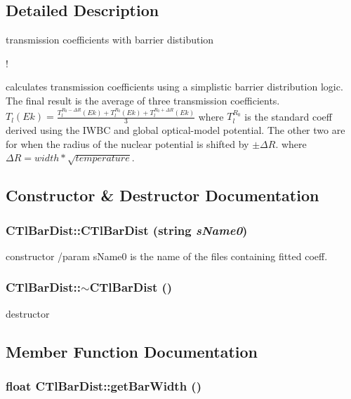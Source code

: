 \subsection{Detailed Description}
transmission coefficients with barrier distibution 

!

calculates transmission coefficients using a simplistic barrier distribution logic. The final result is the average of three transmission coefficients. $ T_{l}(Ek) = \frac{T_{l}^{R_{0}-\Delta R}(Ek) + T_{l}^{R_{0}}(Ek) + T_{l}^{R_{0}+\Delta R}(Ek)}{3} $ where $ T_{l}^{R_{0}}$ is the standard coeff derived using the IWBC and global optical-model potential. The other two are for when the radius of the nuclear potential is shifted by $ \pm \Delta R $. where $ \Delta R = width*\sqrt{temperature} $. 



\subsection{Constructor \& Destructor Documentation}
\subsubsection{\setlength{\rightskip}{0pt plus 5cm}CTl\-Bar\-Dist::CTl\-Bar\-Dist (string {\em s\-Name0})}\label{classCTlBarDist_f7073363a1867be812439512e618440b}


constructor /param s\-Name0 is the name of the files containing fitted coeff. 
\subsubsection{\setlength{\rightskip}{0pt plus 5cm}CTl\-Bar\-Dist::$\sim$CTl\-Bar\-Dist ()}\label{classCTlBarDist_33ee7618d6bf5794654b927ec4c8df20}


destructor 

\subsection{Member Function Documentation}
\subsubsection{\setlength{\rightskip}{0pt plus 5cm}float CTl\-Bar\-Dist::get\-Bar\-Width ()\hspace{0.3cm}{\tt  [static]}}\label{classCTlBarDist_3105dfe03e2ac426ab7b381022f6bb87}


